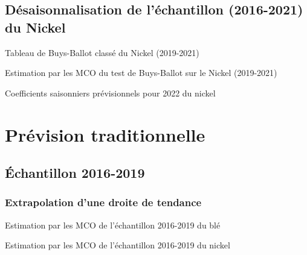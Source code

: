 \documentclass[12pt,a4paper]{article}
\begin{document}
\subsection{Désaisonnalisation de l'échantillon (2016-2021) du Nickel}
\begin{table}[H]
    \centering
    \caption{Tableau de Buys-Ballot classé du Nickel (2019-2021)}
    \sffamily
    \label{tab:bbc}
    \resizebox{\textwidth}{!}{}
\end{table}

\begin{table}[H]
    \centering
    \caption{Estimation par les MCO du test de Buys-Ballot sur le Nickel (2019-2021)}
    \sffamily
    \label{tab:bb_test}
    
\end{table}

\begin{table}[H]
    \centering
    \caption{Coefficients saisonniers prévisionnels pour 2022 du nickel}
    \sffamily
    \label{tab:coef_saiso}
    
\end{table}


\section{Prévision traditionnelle}
\setcounter{table}{0}
\setcounter{figure}{0}
\subsection{Échantillon 2016-2019}
\subsubsection{Extrapolation d'une droite de tendance}
\begin{table}[H]
    \centering
    \caption{Estimation par les MCO de l'échantillon 2016-2019 du blé}
    \sffamily
    \label{tab:mco_ble19}
    
\end{table}

\begin{table}[H]
    \centering
    \caption{Estimation par les MCO de l'échantillon 2016-2019 du nickel}
    \sffamily
    \label{tab:mco_nickel19}
    
\end{table}
\end{document}
